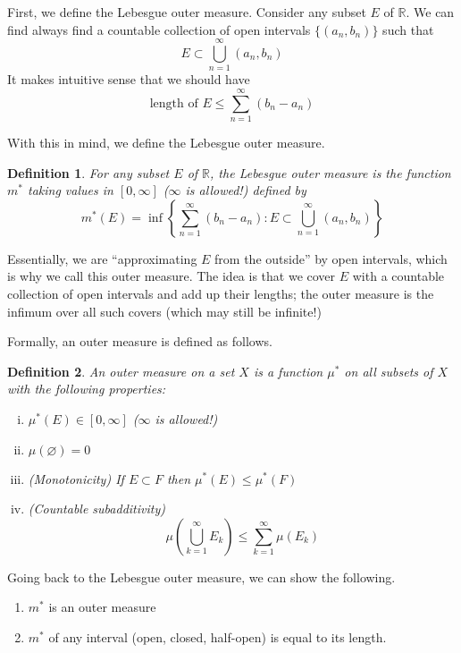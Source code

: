 \documentclass[12pt]{amsart}         %
\newtheorem{definition}{Definition}[section]
\theoremstyle{remark}
\newcommand{\R}{\mathbb{R}}
\begin{document}
First, we define the Lebesgue outer measure. Consider any subset $E$ of $\R$. We can find always find a countable collection of open intervals $\{ (a_n, b_n) \}$ such that 
\[
E \subset \bigcup_{n=1}^\infty (a_n, b_n)
\]
It makes intuitive sense that we should have
\[
\text{length of }E \leq \sum_{n = 1}^\infty (b_n - a_n)
\]

With this in mind, we define the Lebesgue outer measure.

\begin{definition}
For any subset $E$ of $\R$, the Lebesgue outer measure is the function $m^*$ taking values in $[0, \infty]$ ($\infty$ is allowed!) defined by
\[
m^*(E) = \inf\left\{ \sum_{n = 1}^\infty (b_n - a_n) : E \subset \bigcup_{n=1}^\infty (a_n, b_n) \right\}
\]
\end{definition}
Essentially, we are ``approximating $E$ from the outside'' by open intervals, which is why we call this outer measure. The idea is that we cover $E$ with a countable collection of open intervals and add up their lengths; the outer measure is the infimum over all such covers (which may still be infinite!)

Formally, an outer measure is defined as follows.

\begin{definition}An \emph{outer measure} on a set $X$ is a function $\mu^*$ on \emph{all} subsets of $X$ with the following properties:
\begin{enumerate}[(i)]
\item $\mu^*(E) \in [0, \infty]$ ($\infty$ is allowed!)
\item $\mu(\varnothing) = 0$
\item (Monotonicity) If $E \subset F$ then $\mu^*(E) \leq \mu^*(F)$
\item (Countable subadditivity)
	\begin{equation}
	\mu \left( \bigcup_{k=1}^\infty E_k \right) \leq \sum_{k=1}^\infty \mu(E_k)
	\end{equation}
\end{enumerate}
\end{definition}

Going back to the Lebesgue outer measure, we can show the following.
\begin{enumerate}
    \item $m^*$ is an outer measure
    \item $m^*$ of any interval (open, closed, half-open) is equal to its length.
\end{enumerate}
\end{document}
